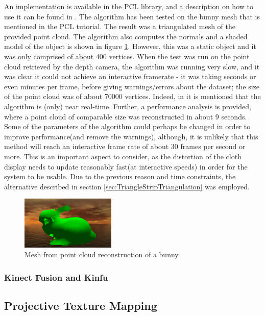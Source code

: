 \documentclass[]{article}
\begin{document}
An implementation is available in the PCL library, and a description on how to use it can be found in \cite{PCLGreedy}. The algorithm has been tested on the bunny mesh that is mentioned in the PCL tutorial. The result was a triangulated mesh of the provided point cloud. The algorithm also computes the normals and a shaded model of the object is shown in figure \ref{fig:ReconstructedBunny}. However, this was a static object and it was only comprised of about 400 vertices. When the test was run on the point cloud retrieved by the depth camera, the algorithm was running very slow, and it was clear it could not achieve an interactive framerate - it was taking seconds or even minutes per frame, before giving warnings/errors about the dataset; the size of the point cloud was of about 70000 vertices. Indeed, in \cite{Marton09ICRA} it is mentioned that the algorithm is (only) near real-time. Further, a performance analysis is provided, where a point cloud of comparable size was reconstructed in about 9 seconds. Some of the parameters of the algorithm could perhaps be changed in order to improve performance(and remove the warnings), although, it is unlikely that this method will reach an interactive frame rate of about 30 frames per second or more. This is an important aspect to consider, as the distortion of the cloth display needs to update reasonably fast(at interactive speeds) in order for the system to be usable. Due to the previous reason and time constraints, the alternative described in section  \ref{sec:TriangleStripTriangulation} was employed.
 
\begin{figure}[hbtp]
    \centering
    \includegraphics[width=0.4\textwidth]{figures/reconstructedBunny.png}
    \caption{Mesh from point cloud reconstruction of a bunny.}
    \label{fig:ReconstructedBunny}
\end{figure}


\subsubsection{Kinect Fusion and Kinfu}

\subsection{Projective Texture Mapping}
\end{document}
